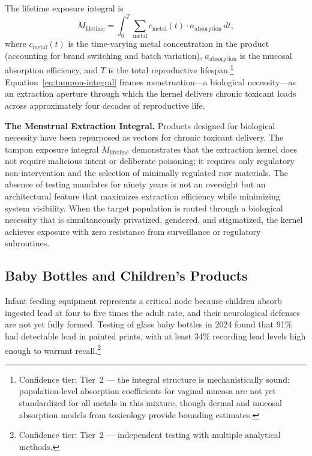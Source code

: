 The lifetime exposure integral is
\begin{equation}
M_{\text{lifetime}} = \int_{0}^{T} \sum_{\text{metal}} c_{\text{metal}}(t) \cdot a_{\text{absorption}} \, dt,
\label{eq:tampon-integral}
\end{equation}
where $c_{\text{metal}}(t)$ is the time-varying metal concentration in the
product (accounting for brand switching and batch variation),
$a_{\text{absorption}}$ is the mucosal absorption efficiency, and $T$ is the
total reproductive lifespan.\footnote{Confidence tier: Tier~2 --- the integral
structure is mechanistically sound; population-level absorption coefficients for
vaginal mucosa are not yet standardized for all metals in this mixture, though
dermal and mucosal absorption models from toxicology provide bounding estimates.}
Equation~\eqref{eq:tampon-integral} frames menstruation---a biological
necessity---as an extraction aperture through which the kernel delivers chronic
toxicant loads across approximately four decades of reproductive life.

\begin{keyinsight}
\textbf{The Menstrual Extraction Integral.} Products designed for biological
necessity have been repurposed as vectors for chronic toxicant delivery. The
tampon exposure integral $M_{\text{lifetime}}$ demonstrates that the extraction
kernel does not require malicious intent or deliberate poisoning; it requires
only regulatory non-intervention and the selection of minimally regulated raw
materials. The absence of testing mandates for ninety years is not an oversight
but an architectural feature that maximizes extraction efficiency while
minimizing system visibility. When the target population is routed through a
biological necessity that is simultaneously privatized, gendered, and
stigmatized, the kernel achieves exposure with zero resistance from surveillance
or regulatory subroutines.
\end{keyinsight}

\subsection{Baby Bottles and Children's Products}

Infant feeding equipment represents a critical node because children
absorb ingested lead at four to five times the adult rate, and their
neurological defenses are not yet fully formed. Testing of glass baby bottles in
2024 found that 91\% had detectable lead in painted prints, with at least 34\%
recording lead levels high enough to warrant
recall.\footnote{Confidence tier:
Tier~2 --- independent testing with multiple analytical methods.}

